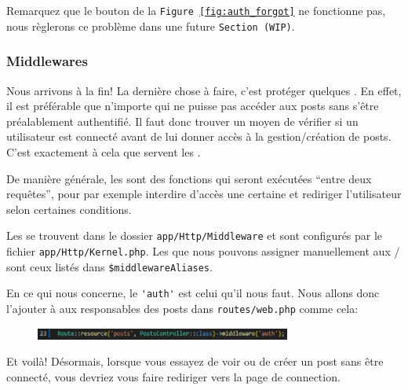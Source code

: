 \newpage

Remarquez que le bouton de la \texttt{Figure~\ref{fig:auth_forgot}} ne fonctionne pas, nous règlerons ce problème dans une future \texttt{Section~(WIP)}.

\subsubsection[Middlewares][laravel.com/docs/10.x/middleware]{Middlewares}

Nous arrivons à la fin! La dernière chose à faire, c'est protéger quelques \routes. En effet, il est préférable que n'importe qui ne puisse pas accéder aux posts sans s'être préalablement authentifié. Il faut donc trouver un moyen de vérifier si un utilisateur est connecté avant de lui donner accès à la gestion/création de posts. C'est exactement à cela que servent les \middlewares{}.

De manière générale, les \middlewares{} sont des fonctions qui seront exécutées ``entre deux requêtes'', pour par exemple interdire d'accès une certaine \route{} et rediriger l'utilisateur selon certaines conditions.

Les \middlewares{} se trouvent dans le dossier \verb|app/Http/Middleware| et sont configurés par le fichier \verb|app/Http/Kernel.php|. Les \middlewares{} que nous pouvons assigner manuellement aux \routes{}/\controllers{} sont ceux listés dans \verb|$middlewareAliases|.

En ce qui nous concerne, le \middleware{} \verb|'auth'| est celui qu'il nous faut. Nous allons donc l'ajouter à aux \routes{} responsables des posts dans \verb|routes/web.php| comme cela:

\begin{figure}[!h]
    \centering
    \includegraphics[width=0.75\textwidth]{figures-C1/middleware_auth.pdf}
\end{figure}

Et voilà! Désormais, lorsque vous essayez de voir ou de créer un post sans être connecté, vous devriez vous faire rediriger vers la page de connection.

\newpage